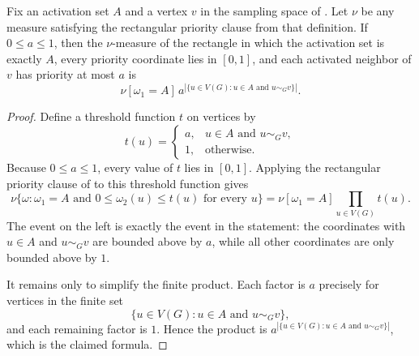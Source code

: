 \begin{helper}
Fix an activation set $A$ and a vertex $v$ in the sampling space of
.  Let $\nu$ be any measure satisfying
the rectangular priority clause from that definition.  If $0\le a\le 1$, then
the $\nu$-measure of the rectangle in which the activation set is exactly
$A$, every priority coordinate lies in $[0,1]$, and each activated neighbor
of $v$ has priority at most $a$ is
\[
\nu[\omega_1=A]\,
a^{|\{u\in V(G):u\in A\text{ and }u\sim_G v\}|}.
\]
\end{helper}
\begin{proof}
Define a threshold function $t$ on vertices by
\[
t(u)=
\begin{cases}
a, & u\in A\text{ and }u\sim_G v,\\
1, & \text{otherwise}.
\end{cases}
\]
Because $0\le a\le 1$, every value of $t$ lies in $[0,1]$.  Applying the
rectangular priority clause of  to
this threshold function gives
\[
\nu\{\omega:\omega_1=A\text{ and }0\le \omega_2(u)\le t(u)
\text{ for every }u\}
=
\nu[\omega_1=A]\prod_{u\in V(G)}t(u).
\]
The event on the left is exactly the event in the statement: the coordinates
with $u\in A$ and $u\sim_G v$ are bounded above by $a$, while all other
coordinates are only bounded above by $1$.

It remains only to simplify the finite product.  Each factor is $a$ precisely
for vertices in the finite set
\[
\{u\in V(G):u\in A\text{ and }u\sim_G v\},
\]
and each remaining factor is $1$.  Hence the product is
$a^{|\{u\in V(G):u\in A\text{ and }u\sim_G v\}|}$, which is the claimed
formula.
\end{proof}
